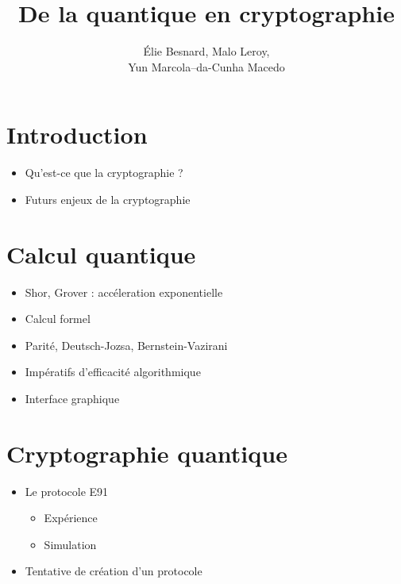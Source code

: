 \documentclass[french]{beamer}
\title{De la quantique en cryptographie}
\author{Élie Besnard, Malo Leroy, \\
Yun Marcola--da-Cunha Macedo}
\institute{Lycée Chateaubriand}
\begin{document}
\begin{frame}
\titlepage
\end{frame}


\section{Introduction}


\begin{frame}
\begin{itemize}
    \item<1-> Qu'est-ce que la cryptographie ?
    \item<2> Futurs enjeux de la cryptographie
\end{itemize}
\end{frame}


\section{Calcul quantique}

\begin{frame}
    \begin{itemize}
        \item<1-> Shor, Grover : accéleration exponentielle
        \item<2-> Calcul formel
        \item<3-> Parité, Deutsch-Jozsa, Bernstein-Vazirani
        \item<4-> Impératifs d'efficacité algorithmique
        \item<5-> Interface graphique
    \end{itemize}
\end{frame}

\section{Cryptographie quantique}

\begin{frame}
\begin{itemize}
    \item<1-> Le protocole E91
    \begin{itemize}
        \item Expérience
        \item Simulation
    \end{itemize}
    \item<2> Tentative de création d'un protocole
\end{itemize}
\end{frame}
\end{document}
